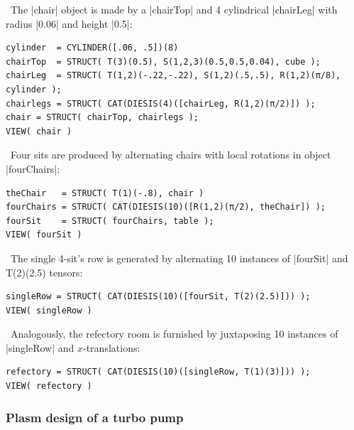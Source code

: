 \begin{coding}
\begin{coding}[Chair]\ 
The |chair| object is made by a |chairTop| and 4 cylindrical |chairLeg| with radius |0.06| and height |0.5|:
\begin{lstlisting}[language=JuliaLocal, style=julia, mathescape=true]
cylinder  = CYLINDER([.06, .5])(8)
chairTop  = STRUCT( T(3)(0.5), S(1,2,3)(0.5,0.5,0.04), cube );
chairLeg  = STRUCT( T(1,2)(-.22,-.22), S(1,2)(.5,.5), R(1,2)(π/8), cylinder );
chairlegs = STRUCT( CAT(DIESIS(4)([chairLeg, R(1,2)(π/2)]) );
chair = STRUCT( chairTop, chairlegs );
VIEW( chair )
\end{lstlisting}
\end{coding}

\begin{coding}\  Four sits are produced by alternating chairs with local rotations in object |fourChairs|:
\begin{lstlisting}[language=JuliaLocal, style=julia, mathescape=true]
theChair   = STRUCT( T(1)(-.8), chair )
fourChairs = STRUCT( CAT(DIESIS(10)([R(1,2)(π/2), theChair]) );
fourSit    = STRUCT( fourChairs, table );
VIEW( fourSit )
\end{lstlisting}
\end{coding}

\begin{coding}\ 
The single 4-sit’s row is generated by alternating 10 instances 
of |fourSit| and T(2)(2.5) tensors:
\begin{lstlisting}[language=JuliaLocal, style=julia, mathescape=true]
singleRow = STRUCT( CAT(DIESIS(10)([fourSit, T(2)(2.5)])) );
VIEW( singleRow )
\end{lstlisting}
\end{coding}

\begin{coding}\ 
Analogously, the refectory room is furnished by juxtaposing 10 instances 
of |singleRow| and $x$-translations:
\begin{lstlisting}[language=JuliaLocal, style=julia, mathescape=true]
refectory = STRUCT( CAT(DIESIS(10)([singleRow, T(1)(3)])) );
VIEW( refectory )
\end{lstlisting}
\end{coding}

\subsubsection*{Plasm design of a turbo pump}\label{sect:4-3-4-1}


\end{coding}
